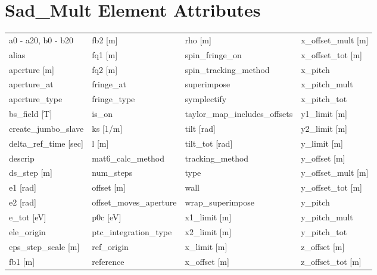  \section{Sad_Mult Element Attributes}
 \label{s:list.sad.mult}
 
 \begin{tabular}{llll} \toprule
a0 - a20, b0 - b20               & fb2 [m]                          & rho [m]                          & x_offset_mult [m]                \\
alias                            & fq1 [m]                          & spin_fringe_on                   & x_offset_tot [m]                 \\
aperture [m]                     & fq2 [m]                          & spin_tracking_method             & x_pitch                          \\
aperture_at                      & fringe_at                        & superimpose                      & x_pitch_mult                     \\
aperture_type                    & fringe_type                      & symplectify                      & x_pitch_tot                      \\
bs_field [T]                     & is_on                            & taylor_map_includes_offsets      & y1_limit [m]                     \\
create_jumbo_slave               & ks [1/m]                         & tilt [rad]                       & y2_limit [m]                     \\
delta_ref_time [sec]             & l [m]                            & tilt_tot [rad]                   & y_limit [m]                      \\
descrip                          & mat6_calc_method                 & tracking_method                  & y_offset [m]                     \\
ds_step [m]                      & num_steps                        & type                             & y_offset_mult [m]                \\
e1 [rad]                         & offset [m]                       & wall                             & y_offset_tot [m]                 \\
e2 [rad]                         & offset_moves_aperture            & wrap_superimpose                 & y_pitch                          \\
e_tot [eV]                       & p0c [eV]                         & x1_limit [m]                     & y_pitch_mult                     \\
ele_origin                       & ptc_integration_type             & x2_limit [m]                     & y_pitch_tot                      \\
eps_step_scale [m]               & ref_origin                       & x_limit [m]                      & z_offset [m]                     \\
fb1 [m]                          & reference                        & x_offset [m]                     & z_offset_tot [m]                 \\
 \bottomrule
 \end{tabular}
 \vfill
 
